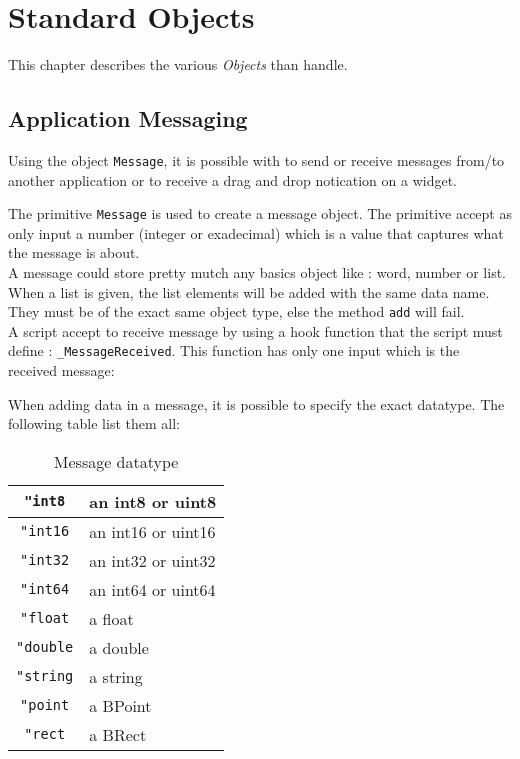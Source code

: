 \chapter{Standard Objects}

This chapter describes the various {\em Objects} than \squirrel handle.

\section{Application Messaging}
 
\cbstart 
Using the object {\tt Message}, it is possible with \squirrel to send or receive messages from/to another application or to receive a drag and drop notication on a widget.\\
\cbend

The primitive {\tt Message} is used to create a message object. The primitive accept as only input a number (integer or exadecimal) which is a value that captures what the message is about.\\

A message could store pretty mutch any basics \squirrel object like : word, number or list. When a list is given, the list elements will be added with the same data name. They must be of the exact same object type, else the method {\tt add} will fail.\\

A \squirrel script accept to receive message by using a hook function that the script must define : {\tt \verb+_+MessageReceived}. This function has only one input which is the received message:


When adding data in a message, it is possible to specify the exact datatype. The following table list them all:

\begin{table}[ht!]
\begin{center}
\begin{tabular}{|c|l|}
\hline
{\tt "int8} & an int8 or uint8 \\
\hline
{\tt "int16} & an int16 or uint16 \\
\hline
{\tt "int32} & an int32 or uint32 \\
\hline
{\tt "int64} & an int64 or uint64 \\
\hline
{\tt "float} & a float \\
\hline
{\tt "double} & a double \\
\hline
{\tt "string} & a string \\
\hline
{\tt "point} & a BPoint \\
\hline
{\tt "rect} & a BRect \\
\hline
\end{tabular}
\end{center}
\caption{Message datatype}
\label{messtype}
\end{table}

